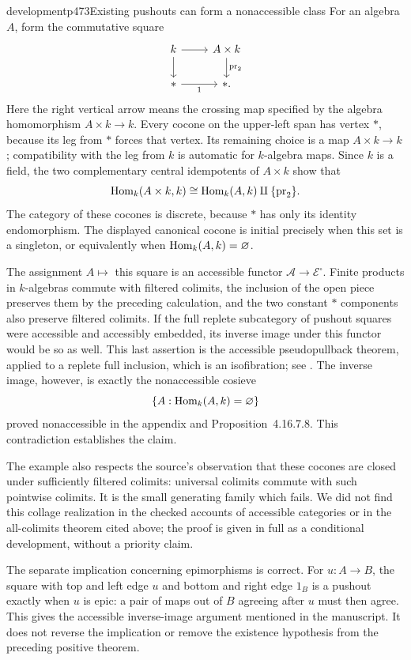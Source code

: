 \begin{dcomment}{development}{p473}{Existing pushouts can form a nonaccessible class}
For an algebra $A$, form the commutative square
\[
 \begin{tikzcd}
 k \arrow[r] \arrow[d] & A\times k \arrow[d,"\operatorname{pr}_2"]\\
 * \arrow[r,"1"'] & * .
 \end{tikzcd}
\]
Here the right vertical arrow means the crossing map specified by the algebra homomorphism $A\times k\to k$. Every cocone on the upper-left span has vertex $*$, because its leg from $*$ forces that vertex. Its remaining choice is a map $A\times k\to k$; compatibility with the leg from $k$ is automatic for $k$-algebra maps. Since $k$ is a field, the two complementary central idempotents of $A\times k$ show that
\[
 \operatorname{Hom}_k(A\times k,k)
 \cong\operatorname{Hom}_k(A,k)\amalg\{\operatorname{pr}_2\}.
\]
The category of these cocones is discrete, because $*$ has only its identity endomorphism. The displayed canonical cocone is initial precisely when this set is a singleton, or equivalently when $\operatorname{Hom}_k(A,k)=\varnothing$.

The assignment $A\mapsto$ this square is an accessible functor $\mathcal A\to\mathcal E^\square$. Finite products in $k$-algebras commute with filtered colimits, the inclusion of the open piece preserves them by the preceding calculation, and the two constant $*$ components also preserve filtered colimits. If the full replete subcategory of pushout squares were accessible and accessibly embedded, its inverse image under this functor would be so as well. This last assertion is the accessible pseudopullback theorem, applied to a replete full inclusion, which is an isofibration; see \citet[Remark~4.9]{BourkeLack2024}. The inverse image, however, is exactly the nonaccessible cosieve
\[
 \{A:\operatorname{Hom}_k(A,k)=\varnothing\}
\]
proved nonaccessible in the appendix and Proposition~4.16.7.8. This contradiction establishes the claim.

The example also respects the source's observation that these cocones are closed under sufficiently filtered colimits: universal colimits commute with such pointwise colimits. It is the small generating family which fails. We did not find this collage realization in the checked accounts of accessible categories or in the all-colimits theorem cited above; the proof is given in full as a conditional development, without a priority claim.

The separate implication concerning epimorphisms is correct. For $u:A\to B$, the square with top and left edge $u$ and bottom and right edge $1_B$ is a pushout exactly when $u$ is epic: a pair of maps out of $B$ agreeing after $u$ must then agree. This gives the accessible inverse-image argument mentioned in the manuscript. It does not reverse the implication or remove the existence hypothesis from the preceding positive theorem.
\end{dcomment}


